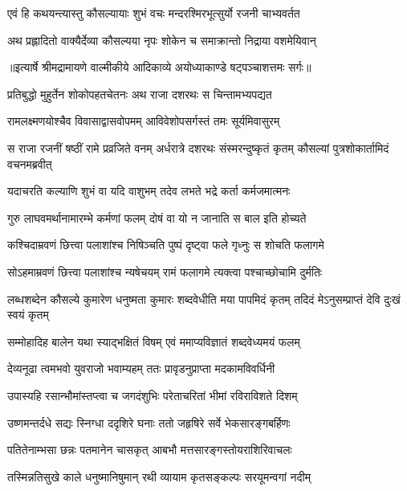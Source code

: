 \twolineshloka
{एवं हि कथयन्त्यास्तु कौसल्यायाः शुभं वचः}
{मन्दरश्मिरभूत्सुर्यो रजनी चाभ्यवर्तत} %

\twolineshloka
{अथ प्रह्लादितो वाक्यैर्देव्या कौसल्यया नृपः}
{शोकेन च समाक्रान्तो निद्राया वशमेयिवान्} %


{॥इत्यार्षे श्रीमद्रामायणे वाल्मीकीये आदिकाव्ये अयोध्याकाण्डे षट्पञ्चाशत्तमः सर्गः॥}


\twolineshloka
{प्रतिबुद्धो मुहुर्तेन शोकोपहतचेतनः}
{अथ राजा दशरथः स चिन्तामभ्यपद्यत} %

\twolineshloka
{रामलक्ष्मणयोश्चैव विवासाद्वासवोपमम्}
{आविवेशोपसर्गस्तं तमः सूर्यमिवासुरम्} %

\threelineshloka
{स राजा रजनीं षष्ठीं रामे प्रव्रजिते वनम्}
{अर्धरात्रे दशरथः संस्मरन्दुष्कृतं कृतम्}
{कौसल्यां पुत्रशोकार्तामिदं वचनमब्रवीत्} %

\twolineshloka
{यदाचरति कल्याणि शुभं वा यदि वाशुभम्}
{तदेव लभते भद्रे कर्ता कर्मजमात्मनः} %

\twolineshloka
{गुरु लाघवमर्थानामारम्भे कर्मणां फलम्}
{दोषं वा यो न जानाति स बाल इति होच्यते} %

\twolineshloka
{कश्चिदाम्रवणं छित्त्वा पलाशांश्च निषिञ्चति}
{पुष्पं दृष्ट्वा फले गृध्नुः स शोचति फलागमे} %

\twolineshloka
{सोऽहमाम्रवणं छित्त्वा पलाशांश्च न्यषेचयम्}
{रामं फलागमे त्यक्त्वा पश्चाच्छोचामि दुर्मतिः} %

\threelineshloka
{लब्धशब्देन कौसल्ये कुमारेण धनुष्मता}
{कुमारः शब्दवेधीति मया पापमिदं कृतम्}
{तदिदं मेऽनुसम्प्राप्तं देवि दुःखं स्वयं कृतम्} %

\twolineshloka
{सम्मोहादिह बालेन यथा स्याद्भक्षितं विषम्}
{एवं ममाप्यविज्ञातं शब्दवेध्यमयं फलम्} %

\twolineshloka
{देव्यनूढा त्वमभवो युवराजो भवाम्यहम्}
{ततः प्रावृडनुप्राप्ता मदकामविवर्धिनी} %

\twolineshloka
{उपास्यहि रसान्भौमांस्तप्त्वा च जगदंशुभिः}
{परेताचरितां भीमां रविराविशते दिशम्} %

\twolineshloka
{उष्णमन्तर्दधे सद्यः स्निग्धा ददृशिरे घनाः}
{ततो जहृषिरे सर्वे भेकसारङ्गबर्हिणः} %

\twolineshloka
{पतितेनाम्भसा छन्नः पतमानेन चासकृत्}
{आबभौ मत्तसारङ्गस्तोयराशिरिवाचलः} %

\twolineshloka
{तस्मिन्नतिसुखे काले धनुष्मानिषुमान् रथी}
{व्यायाम कृतसङ्कल्पः सरयूमन्वगां नदीम्} %

